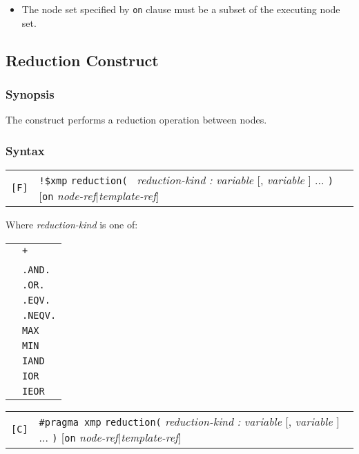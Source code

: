 \begin{itemize}
\item The node set specified by {\tt on} clause must be a subset of the
      executing node set.  
\end{itemize}

\subsection{Reduction Construct}

\subsubsection*{Synopsis}

The {\tt {}} construct performs a reduction
operation between nodes. 

\subsubsection*{Syntax}

\begin{tabular}{ll}
\verb![F]! & \verb|!$xmp| {\tt reduction( } {\it reduction-kind} {\it
  :} {\it variable} [, {\it variable} ] ... {\tt )} [{\tt on} {\it
      node-ref}$\vert${\it template-ref}] \\
\end{tabular}

Where {\it reduction-kind} is one of:

\begin{tabular}{ll}
 \hspace{0.5cm} & {\tt +} \\
 & {\tt *} \\
 & {\tt .AND.} \\
 & {\tt .OR.} \\
 & {\tt .EQV.} \\
 & {\tt .NEQV.} \\
 & {\tt MAX} \\
 & {\tt MIN} \\
 & {\tt IAND} \\
 & {\tt IOR} \\
 & {\tt IEOR} \\
\end{tabular}

\begin{tabular}{ll}
\verb![C]! & \verb|#pragma xmp| {\tt reduction(} {\it reduction-kind} {\it
  :} {\it variable} [, {\it variable} ] ... {\tt )} [{\tt on} {\it
      node-ref}$\vert${\it template-ref}] \\
\end{tabular}

